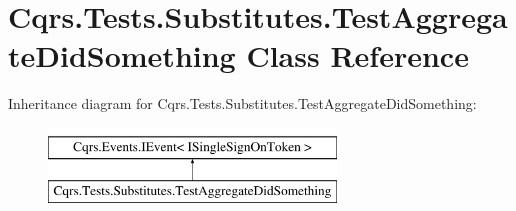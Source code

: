 \hypertarget{classCqrs_1_1Tests_1_1Substitutes_1_1TestAggregateDidSomething}{}\section{Cqrs.\+Tests.\+Substitutes.\+Test\+Aggregate\+Did\+Something Class Reference}
\label{classCqrs_1_1Tests_1_1Substitutes_1_1TestAggregateDidSomething}
Inheritance diagram for Cqrs.\+Tests.\+Substitutes.\+Test\+Aggregate\+Did\+Something\+:\begin{figure}[H]
\begin{center}
\leavevmode
\includegraphics[height=2.000000cm]{classCqrs_1_1Tests_1_1Substitutes_1_1TestAggregateDidSomething}
\end{center}
\end{figure}
